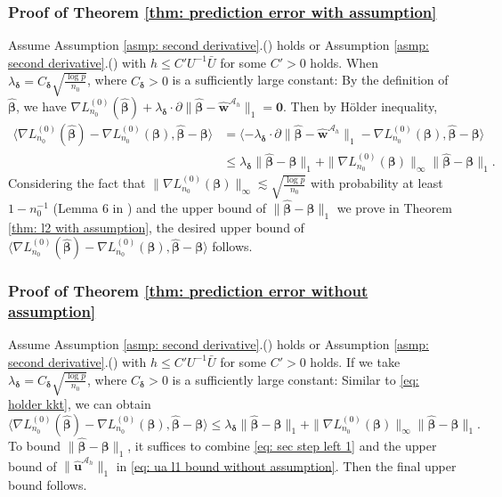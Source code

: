 \documentclass[12pt]{article}
\newcommand*{\rom}[1]{\romannumeral #1}
\newcommand{\bdelta}{\bm{\delta}}
\newcommand{\infnorm}[1]{\|#1\|_{\infty}}
\newcommand{\onenorm}[1]{\|#1\|_{1}}
\newcommand{\bbeta}{\bm{\beta}}
\newcommand{\hbeta}{\hat{\bm{\beta}}}
\newcommand{\huah}{\hat{\bm{u}}^{\mathcal{A}_h}}
\newcommand{\hwah}{\hat{\bm{w}}^{\mathcal{A}_h}}
\newcommand{\<}{\langle}
\renewcommand{\>}{\rangle}
\begin{document}
\subsubsection{Proof of Theorem \ref{thm: prediction error with assumption}}
Assume Assumption \ref{asmp: second derivative}.(\rom{1}) holds or Assumption \ref{asmp: second derivative}.(\rom{2}) with $h \leq C'U^{-1}\bar{U}$ for some $C' > 0$ holds. When $\lambda_{\bdelta} = C_{\bdelta}\sqrt{\frac{\log p}{n_0}}$, where $C_{\bdelta} > 0$ is a sufficiently large constant: By the definition of $\hbeta$, we have $\nabla L_{n_0}^{(0)}(\hbeta) + \lambda_{\bdelta}\cdot \partial \onenorm{\hbeta - \hwah} = \bm{0}$. Then by H\"older inequality,
\begin{align}
	\<\nabla L_{n_0}^{(0)}(\hbeta) - \nabla L_{n_0}^{(0)}(\bbeta), \hbeta - \bbeta\> &= \<-\lambda_{\bdelta}\cdot \partial \onenorm{\hbeta - \hwah}- \nabla L_{n_0}^{(0)}(\bbeta), \hbeta - \bbeta\> \\
	&\leq \lambda_{\bdelta}\onenorm{\hbeta - \bbeta} + \infnorm{\nabla L_{n_0}^{(0)}(\bbeta)}\onenorm{\hbeta - \bbeta}. \label{eq: holder kkt}
\end{align}
Considering the fact that $\infnorm{\nabla L_{n_0}^{(0)}(\bbeta)} \lesssim \sqrt{\frac{\log p}{n_0}}$ with probability at least $1-n_0^{-1}$ (Lemma 6 in \cite{negahban2009unified}) and the upper bound of $\onenorm{\hbeta - \bbeta}$ we prove in Theorem \ref{thm: l2 with assumption}, the desired upper bound of $\<\nabla L_{n_0}^{(0)}(\hbeta) - \nabla L_{n_0}^{(0)}(\bbeta), \hbeta - \bbeta\>$ follows.



\subsubsection{Proof of Theorem \ref{thm: prediction error without assumption}}
Assume Assumption \ref{asmp: second derivative}.(\rom{1}) holds or Assumption \ref{asmp: second derivative}.(\rom{2}) with $h \leq C'U^{-1}\bar{U}$ for some $C' > 0$ holds. If we take $\lambda_{\bdelta} = C_{\bdelta}\sqrt{\frac{\log p}{n_0}}$, where $C_{\bdelta} > 0$ is a sufficiently large constant: Similar to \eqref{eq: holder kkt}, we can obtain
\begin{equation}
	\<\nabla L_{n_0}^{(0)}(\hbeta) - \nabla L_{n_0}^{(0)}(\bbeta), \hbeta - \bbeta\> \leq \lambda_{\bdelta}\onenorm{\hbeta - \bbeta} + \infnorm{\nabla L_{n_0}^{(0)}(\bbeta)}\onenorm{\hbeta - \bbeta}. 
\end{equation}
To bound $\onenorm{\hbeta - \bbeta}$, it suffices to combine \eqref{eq: sec step left 1} and the upper bound of $\onenorm{\huah}$ in \eqref{eq: ua l1 bound without assumption}. Then the final upper bound follows.
\end{document}
